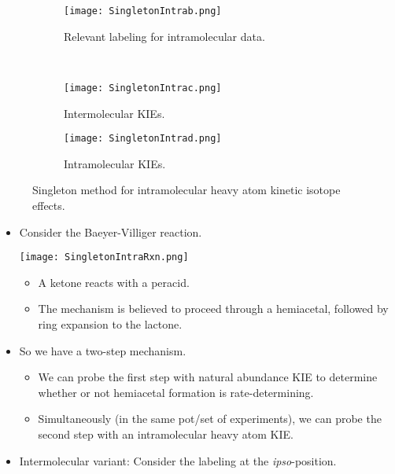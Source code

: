 \documentclass[../notes.tex]{subfiles}
\begin{document}
\begin{itemize}
\begin{figure}[h!]
\begin{subfigure}[b]{0.45\linewidth}
            \centering
            \texttt{[image: SingletonIntrab.png]}
            \caption{Relevant labeling for intramolecular data.}
            \label{fig:SingletonIntrab}
        \end{subfigure}\\[2em]
        \begin{subfigure}[b]{0.3\linewidth}
            \centering
            \texttt{[image: SingletonIntrac.png]}
            \caption{Intermolecular KIEs.}
            \label{fig:SingletonIntrac}
        \end{subfigure}
        \begin{subfigure}[b]{0.3\linewidth}
            \centering
            \texttt{[image: SingletonIntrad.png]}
            \caption{Intramolecular KIEs.}
            \label{fig:SingletonIntrad}
        \end{subfigure}
        \caption{Singleton method for intramolecular heavy atom kinetic isotope effects.}
        \label{fig:SingletonIntra}
    \end{figure}
    \begin{itemize}
        \item Consider the Baeyer-Villiger reaction.
        \begin{center}
            \texttt{[image: SingletonIntraRxn.png]}
        \end{center}
        \begin{itemize}
            \item A ketone reacts with a peracid.
            \item The mechanism is believed to proceed through a hemiacetal, followed by ring expansion to the lactone.
        \end{itemize}
        \item So we have a two-step mechanism.
        \begin{itemize}
            \item We can probe the first step with natural abundance KIE to determine whether or not hemiacetal formation is rate-determining.
            \item Simultaneously (in the same pot/set of experiments), we can probe the second step with an intramolecular heavy atom KIE.
        \end{itemize}
        \item Intermolecular variant: Consider the labeling at the \emph{ipso}-position.
        \begin{itemize}

\end{itemize}
\end{itemize}
\end{itemize}
\end{document}
